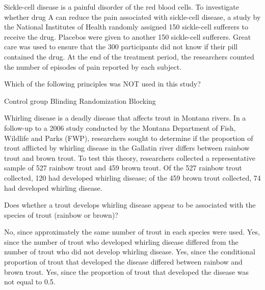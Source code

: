 \documentclass{article}
\begin{document}
\begin{mcquestions}
		\begin{mcquestioninstruction}
			Sickle-cell disease is a painful disorder of the red blood cells. To investigate whether drug A can reduce the pain associated with sickle-cell disease, a study by the National Institutes of Health randomly assigned 150 sickle-cell sufferers to receive the drug. Placebos were given to another 150 sickle-cell sufferers. Great care was used to ensure that the 300 participants did not know if their pill contained the drug. At the end of the treatment period, the researchers counted the number of episodes of pain reported by each subject.
		\end{mcquestioninstruction}
		\question Which of the following principles was NOT used in this study?
		\begin{mcanswerslist}
			\answer Control group
			\answer Blinding
			\answer Randomization
			\answer[correct] Blocking
		\end{mcanswerslist}
		
		\begin{mcquestioninstruction}
			Whirling disease is a deadly disease that affects trout in Montana rivers. In a follow-up to a 2006 study conducted by the Montana Department of Fish, Wildlife and Parks (FWP), researchers sought to determine if the proportion of trout afflicted by whirling disease in the Gallatin river differs between rainbow trout and brown trout. To test this theory, researchers collected a representative sample of 527 rainbow trout and 459 brown trout. Of the 527 rainbow trout collected, 120 had developed whirling disease; of the 459 brown trout collected, 74 had developed whirling disease.
		\end{mcquestioninstruction}
		\question Does whether a trout develops whirling disease appear to be associated with the species of trout (rainbow or brown)?
		\begin{mcanswerslist}
			\answer No, since approximately the same number of trout in each species were used.
			\answer Yes, since the number of trout who developed whirling disease differed from the number of trout who did not develop whirling disease.
			\answer[correct] Yes, since the conditional proportion of trout that developed the disease differed between rainbow and brown trout.
			\answer Yes, since the proportion of trout that developed the disease was not equal to 0.5.
		\end{mcanswerslist}
		

\end{mcquestions}
\end{document}

